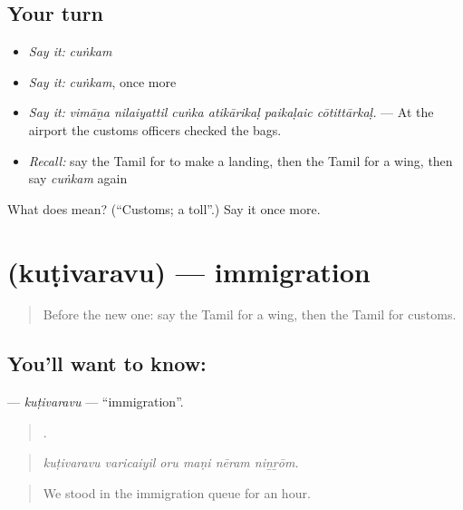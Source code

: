 \subsection*{Your turn}
\begin{itemize}
\raggedright
  \item \emph{Say it:} \emph{cuṅkam}
  \item \emph{Say it:} \emph{cuṅkam}, once more
  \item \emph{Say it:} \emph{vimāṉa nilaiyattil cuṅka atikārikaḷ paikaḷaic cōtittārkaḷ.} — At the airport the customs officers checked the bags.
  \item \emph{Recall:} say the Tamil for to make a landing, then the Tamil for a wing, then say \emph{cuṅkam} again
\end{itemize}

\begin{tcolorbox}[breakable,colback=teal!4,colframe=teal!35!black,title={Before you move on}]
What does  mean? (\textquotedblleft{}Customs; a toll\textquotedblright{}.) Say it once more.
\end{tcolorbox}
\section[\texorpdfstring{\ta{குடிவரவு} (kuṭivaravu)}{குடிவரவு (kuṭivaravu)}]{ (kuṭivaravu) — immigration}

\label{lesson:TA-C413-kutivaravu}



\begin{quote}
Before the new one: say the Tamil for a wing, then the Tamil for customs.
\end{quote}

\subsection*{You'll want to know: }
\textbf{} — \emph{kuṭivaravu} — \textquotedblleft{}immigration\textquotedblright{}.

\begin{quote}
     .
\end{quote}

\begin{quote}
\emph{kuṭivaravu varicaiyil oru maṇi nēram niṉṟōm.}
\end{quote}

\begin{quote}
We stood in the immigration queue for an hour.
\end{quote}

